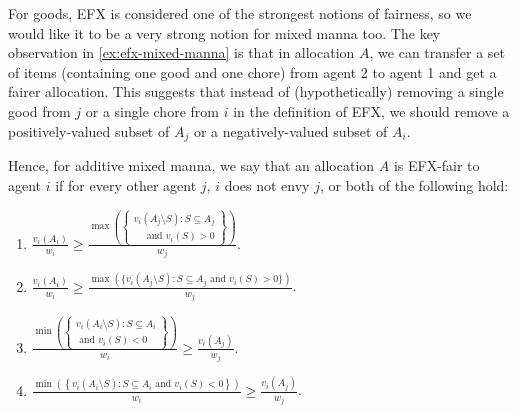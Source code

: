 
For goods, EFX is considered one of the strongest notions of fairness,
so we would like it to be a very strong notion for mixed manna too.
The key observation in \cref{ex:efx-mixed-manna} is that in allocation $A$,
we can transfer a set of items (containing one good and one chore) from agent 2 to agent 1
and get a fairer allocation.
This suggests that instead of (hypothetically) removing a single good from $j$
or a single chore from $i$ in the definition of EFX,
we should remove a positively-valued subset of $A_j$
or a negatively-valued subset of $A_i$.

Hence, for additive mixed manna, we say that an allocation $A$ is EFX-fair to agent $i$
if for every other agent $j$, $i$ does not envy $j$, or both of the following hold:
\begin{enumerate}
\ifColsTwo
\item $\displaystyle
\frac{v_i(A_i)}{w_i} \ge \frac{\max\left(\left\{
    \begin{array}{r}
    v_i(A_j \setminus S): S \subseteq A_j
    \\\quad \textrm{ and } v_i(S) > 0
    \end{array}\right\}\right)}{w_j}$.
\else
\item $\displaystyle \frac{v_i(A_i)}{w_i} \ge \frac{\max(\{v_i(A_j \setminus S): S \subseteq A_j
    \textrm{ and } v_i(S) > 0\})}{w_j}$.
\fi
\ifColsTwo
\item $\displaystyle
\frac{\min\left(\left\{
    \begin{array}{r}
    v_i(A_i \setminus S): S \subseteq A_i
    \\ \textrm{ and } v_i(S) < 0
    \end{array}\right\}\right)}{w_i} \ge \frac{v_i(A_j)}{w_j}$.
\else
\item $\displaystyle \frac{\min\left(\left\{v_i(A_i \setminus S): S \subseteq A_i
    \textrm{ and } v_i(S) < 0 \right\}\right)}{w_i} \ge \frac{v_i(A_j)}{w_j}$.
\fi
\end{enumerate}

